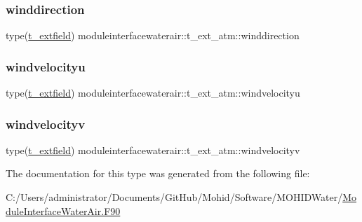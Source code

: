 \subsubsection{\texorpdfstring{winddirection}{winddirection}}
{\footnotesize\ttfamily type(\mbox{\hyperlink{structmoduleinterfacewaterair_1_1t__extfield}{t\+\_\+extfield}}) moduleinterfacewaterair\+::t\+\_\+ext\+\_\+atm\+::winddirection\hspace{0.3cm}{\ttfamily [private]}}

\mbox{\label{structmoduleinterfacewaterair_1_1t__ext__atm_addf9901d5aa55db72480a0fd2b508742}} 
\subsubsection{\texorpdfstring{windvelocityu}{windvelocityu}}
{\footnotesize\ttfamily type(\mbox{\hyperlink{structmoduleinterfacewaterair_1_1t__extfield}{t\+\_\+extfield}}) moduleinterfacewaterair\+::t\+\_\+ext\+\_\+atm\+::windvelocityu\hspace{0.3cm}{\ttfamily [private]}}

\mbox{\label{structmoduleinterfacewaterair_1_1t__ext__atm_a0e0fd1807efd59db67439a4ba393543b}} 
\subsubsection{\texorpdfstring{windvelocityv}{windvelocityv}}
{\footnotesize\ttfamily type(\mbox{\hyperlink{structmoduleinterfacewaterair_1_1t__extfield}{t\+\_\+extfield}}) moduleinterfacewaterair\+::t\+\_\+ext\+\_\+atm\+::windvelocityv\hspace{0.3cm}{\ttfamily [private]}}



The documentation for this type was generated from the following file\+:\begin{DoxyCompactItemize}
\item 
C\+:/\+Users/administrator/\+Documents/\+Git\+Hub/\+Mohid/\+Software/\+M\+O\+H\+I\+D\+Water/\mbox{\hyperlink{_module_interface_water_air_8_f90}{Module\+Interface\+Water\+Air.\+F90}}\end{DoxyCompactItemize}
